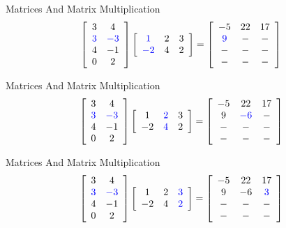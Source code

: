 \begin{frame}{Matrices And Matrix Multiplication}
\[ \left[ \begin{array}{cc} 3 & 4  \\ \textcolor{blue}{ 3 } & \textcolor{blue}{ -3 }  \\ 4 & -1  \\ 0 & 2 \end{array} \right]  \left[ \begin{array}{ccc} \textcolor{blue}{ 1 } & 2 & 3  \\ \textcolor{blue}{ -2 } & 4 & 2 \end{array} \right]   =  \left[ \begin{array}{ccc} -5 & 22 & 17  \\ \textcolor{blue}{ 9 } & - & -  \\ - & - & -  \\ - & - & - \end{array} \right]  \]
\end{frame}


\begin{frame}{Matrices And Matrix Multiplication}
\[ \left[ \begin{array}{cc} 3 & 4  \\ \textcolor{blue}{ 3 } & \textcolor{blue}{ -3 }  \\ 4 & -1  \\ 0 & 2 \end{array} \right]  \left[ \begin{array}{ccc} 1 & \textcolor{blue}{ 2 } & 3  \\ -2 & \textcolor{blue}{ 4 } & 2 \end{array} \right]   =  \left[ \begin{array}{ccc} -5 & 22 & 17  \\ 9 & \textcolor{blue}{ -6 } & -  \\ - & - & -  \\ - & - & - \end{array} \right]  \]
\end{frame}


\begin{frame}{Matrices And Matrix Multiplication}
\[ \left[ \begin{array}{cc} 3 & 4  \\ \textcolor{blue}{ 3 } & \textcolor{blue}{ -3 }  \\ 4 & -1  \\ 0 & 2 \end{array} \right]  \left[ \begin{array}{ccc} 1 & 2 & \textcolor{blue}{ 3 }  \\ -2 & 4 & \textcolor{blue}{ 2 } \end{array} \right]   =  \left[ \begin{array}{ccc} -5 & 22 & 17  \\ 9 & -6 & \textcolor{blue}{ 3 }  \\ - & - & -  \\ - & - & - \end{array} \right]  \]
\end{frame}


